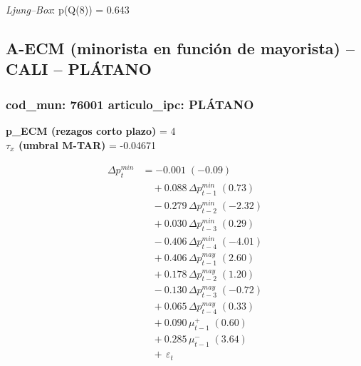 \documentclass[
  12pt,
]{article}
\begin{document}
\emph{Ljung--Box}: p(Q(8)) = 0.643

\subsection{A-ECM (minorista en función de mayorista) -- CALI --
PLÁTANO}\label{a-ecm-minorista-en-funciuxf3n-de-mayorista-cali-pluxe1tano}

\subsubsection{cod\_mun: 76001 \textbar{} articulo\_ipc:
PLÁTANO}\label{cod_mun-76001-articulo_ipc-pluxe1tano}

\textbf{p\_ECM (rezagos corto plazo)} = 4\\
\textbf{\(\tau_x\) (umbral M-TAR)} = -0.04671

\[
\begin{aligned}
\Delta p^{min}_{t} &= -0.001\;(-0.09) \\
&\quad + 0.088\,\Delta p^{min}_{t-1}\;(0.73) \\
&\quad − 0.279\,\Delta p^{min}_{t-2}\;(-2.32) \\
&\quad + 0.030\,\Delta p^{min}_{t-3}\;(0.29) \\
&\quad − 0.406\,\Delta p^{min}_{t-4}\;(-4.01) \\
&\quad + 0.406\,\Delta p^{may}_{t-1}\;(2.60) \\
&\quad + 0.178\,\Delta p^{may}_{t-2}\;(1.20) \\
&\quad − 0.130\,\Delta p^{may}_{t-3}\;(-0.72) \\
&\quad + 0.065\,\Delta p^{may}_{t-4}\;(0.33) \\
&\quad + 0.090\,\mu^{+}_{t-1}\;(0.60) \\
&\quad + 0.285\,\mu^{-}_{t-1}\;(3.64) \\
&\quad +\, \varepsilon_t
\end{aligned}
\]
\end{document}
